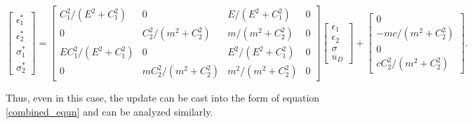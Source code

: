 \documentclass[11pt]{elsarticle}
\begin{document}
\begin{equation}
	\begin{bmatrix}
		\epsilon_1^* \\
		\epsilon_2^* \\
		\sigma_1^* \\
		\sigma_2^* 
	\end{bmatrix} 
	= 
	\begin{bmatrix}
		C_1^2/(E^2 + C_1^2) & 0 & E/(E^2 + C_1^2) & 0 \\
		0 & C_2^2/(m^2 + C_2^2)  & m/(m^2 + C_2^2) &0 \\
		E C_1^2/(E^2 + C_1^2) & 0 & E^2/(E^2 + C_1^2) &0\\
		0 & mC_2^2/(m^2 + C_2^2)  & m^2/(m^2 + C_2^2) &0
	\end{bmatrix} 
	\begin{bmatrix}
		\epsilon_1 \\
		\epsilon_2 \\
		\sigma \\
		u_D
	\end{bmatrix} + 
	\begin{bmatrix}
		0 \\
		-mc/(m^2+C_2^2) \\
		0 \\
		cC_2^2/(m^2+C_2^2)
	\end{bmatrix} .
\end{equation}

Thus, even in this case, the update can be cast into the form of equation \ref{combined_equn} and can be analyzed similarly.
\end{document}
